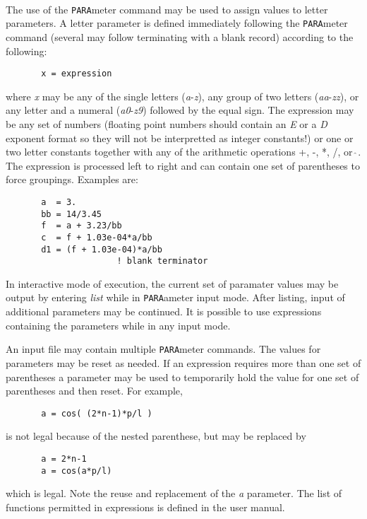  \\{\smallskip}
\headb

The use of the {\tt PARA}meter command may be used to
assign values to letter parameters.  A letter parameter is
defined immediately following the {\tt PARA}meter command (several may
follow terminating with a blank record) according to the
following:

\begin{verbatim}
       x = expression
\end{verbatim}
where {\it x} may be any of the single letters ({\it a}-{\it z}), any group
of two letters ({\it aa}-{\it zz}), or any letter and a
numeral ({\it a0}-{\it z9})
followed by the equal sign.  The expression may be any set of
numbers (floating point numbers should contain an {\it E} or a {\it D}
exponent format so they will not be interpretted as integer
constants!) or one or two letter constants together with any of the
arithmetic operations +, -, *, /, or $\hat {~}$.
The expression is processed left to right and can contain one set of
parentheses to force groupings.  Examples are:

\begin{verbatim}
       a  = 3.
       bb = 14/3.45
       f  = a + 3.23/bb
       c  = f + 1.03e-04*a/bb
       d1 = (f + 1.03e-04)*a/bb
                      ! blank terminator
\end{verbatim}
In interactive mode of execution, the current set of paramater
values may be output by entering {\it list} while in
{\tt PARA}ameter input mode.  After listing, input of additional
parameters may be continued.  It is possible to use expressions
containing the parameters while in any input mode.

An input file may contain multiple {\tt PARA}meter commands.  The
values for parameters may be reset as needed.  If an
expression requires more than one set of parentheses a parameter
may be used to temporarily hold the value for one set of parentheses
and then reset.  For example,

\begin{verbatim}
       a = cos( (2*n-1)*p/l )
\end{verbatim}
is not legal because of the nested parenthese, but may be replaced by

\begin{verbatim}
       a = 2*n-1
       a = cos(a*p/l)
\end{verbatim}
which is legal.  Note the reuse and replacement of the {\it a} parameter.
The list of functions permitted in expressions is defined in the user
manual.
\vfil\eject
